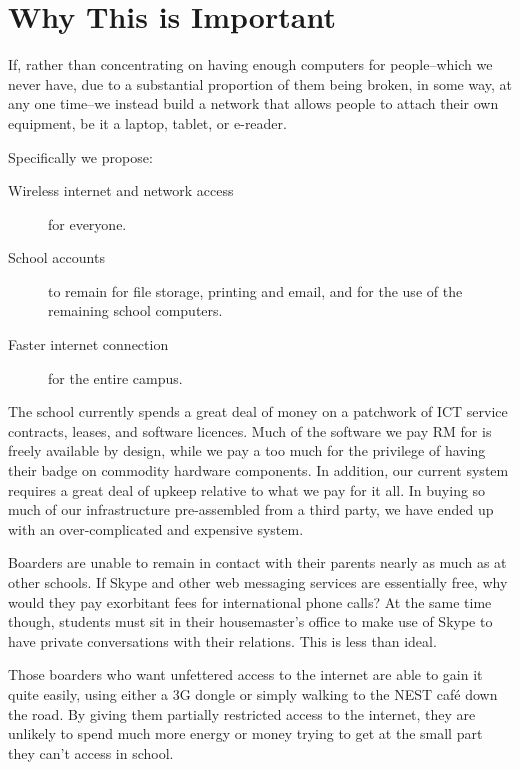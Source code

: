 \documentclass[a4paper,leqno,titlepage]{article}
\begin{document}
\break

\section{Why This is Important}


If, rather than concentrating on having enough computers for people--which we
never have, due to a substantial proportion of them being broken, in some way,
at any one time--we instead build a network that allows people to attach their
own equipment, be it a laptop, tablet, or e-reader.

Specifically we propose:
    
\begin{description}

\item[Wireless internet and network access] for everyone.
\item[School accounts] to remain for file storage, printing and email, and for
the use of the remaining school computers.
\item[Faster internet connection] for the entire campus.


\end{description}


The school currently spends a great deal of money on a patchwork of ICT
service contracts, leases, and software licences.
Much of the software we pay RM for is freely available by design, while we pay
a too much for the privilege of having their badge on commodity hardware components.
In addition, our current system requires a great deal of upkeep relative to
what we pay for it all. In buying so much of our infrastructure pre-assembled
from a third party, we have ended up with an over-complicated and
expensive system.


Boarders are unable to remain in contact with their parents nearly as much
as at other schools. If Skype and other web messaging services are essentially free, why
would they pay exorbitant fees for international phone calls? At the same time though, students
must sit in their housemaster's office to make use of Skype to have private conversations with their
relations. This is less than ideal.


Those boarders who want unfettered access to the internet are
able to gain it quite easily, using either a 3G dongle or simply walking to the NEST
café down the road. By giving them partially restricted access to the internet,
they are unlikely to spend much more energy or money trying to get at the small part
they can't access in school.
\end{document}
